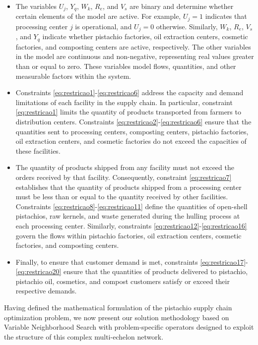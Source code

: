 \documentclass[preprint,12pt,authoryear]{elsarticle}
\begin{document}
\begin{itemize}
  \item The variables $U_j$, $Y_q$, $W_k$, $R_e$, and $V_s$ are binary and determine whether certain elements of the model are active. For example, $U_j = 1$ indicates that processing center $j$ is 
  operational, and $U_j = 0$ otherwise. Similarly, $W_k$, $R_e$, $V_s$, and $Y_q$ indicate whether pistachio factories, oil extraction centers, cosmetic factories, and composting centers are active, 
  respectively. The other variables in the model are continuous and non-negative, representing real values greater than or equal to zero. These variables model flows, 
  quantities, and other measurable factors within the system.
  
  \item Constraints \eqref{eq:restricao1}-\eqref{eq:restricao6} address the capacity and demand limitations of each facility in the supply chain. In particular, constraint \eqref{eq:restricao1} 
  limits the quantity of products transported from farmers to distribution centers. Constraints \eqref{eq:restricao2}-\eqref{eq:restricao6} ensure that the quantities sent to processing centers, 
  composting centers, pistachio factories, oil extraction centers, and cosmetic factories do not exceed the capacities of these facilities.
  
  \item The quantity of products shipped from any facility must not exceed the orders received by that facility. Consequently, constraint \eqref{eq:restricao7} establishes that the quantity of 
  products shipped from a processing center must be less than or equal to the quantity received by other facilities. Constraints \eqref{eq:restricao8}-\eqref{eq:restricao11} define the 
  quantities of open-shell pistachios, raw kernels, and waste generated during the hulling process at each processing center. Similarly, constraints \eqref{eq:restricao12}-\eqref{eq:restricao16} 
  govern the flows within pistachio factories, oil extraction centers, cosmetic factories, and composting centers.
  
  \item Finally, to ensure that customer demand is met, constraints \eqref{eq:restricao17}-\eqref{eq:restricao20} ensure that the quantities of products delivered to pistachio, pistachio oil, 
  cosmetics, and compost customers satisfy or exceed their respective demands.
\end{itemize}

Having defined the mathematical formulation of the pistachio supply chain optimization problem, we now present our solution methodology based on Variable Neighborhood Search with 
problem-specific operators designed to exploit the structure of this complex multi-echelon network.
\end{document}
